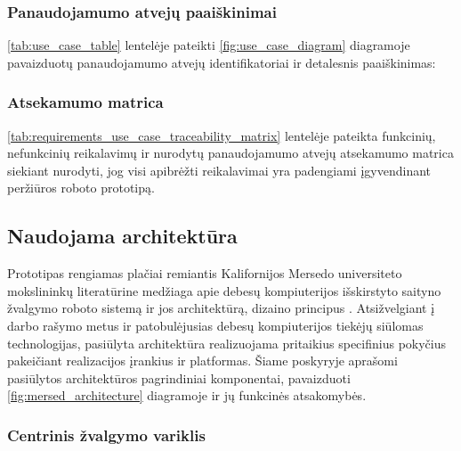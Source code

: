 \subsubsection{Panaudojamumo atvejų paaiškinimai}
\ref{tab:use_case_table} lentelėje pateikti \ref{fig:use_case_diagram} diagramoje pavaizduotų panaudojamumo atvejų identifikatoriai ir detalesnis paaiškinimas:



\subsubsection{Atsekamumo matrica}

\ref{tab:requirements_use_case_traceability_matrix} lentelėje pateikta funkcinių, nefunkcinių reikalavimų ir nurodytų panaudojamumo atvejų atsekamumo matrica siekiant nurodyti, jog visi apibrėžti reikalavimai yra padengiami įgyvendinant peržiūros roboto prototipą.



\subsection{Naudojama architektūra}

Prototipas rengiamas plačiai remiantis Kalifornijos Mersedo universiteto mokslininkų literatūrine medžiaga apie debesų kompiuterijos išskirstyto saityno žvalgymo roboto sistemą ir jos architektūrą, dizaino principus \cite{MercedCloudBasedWebCrawler}. Atsižvelgiant į darbo rašymo metus ir patobulėjusias debesų kompiuterijos tiekėjų siūlomas technologijas, pasiūlyta architektūra realizuojama pritaikius specifinius pokyčius pakeičiant realizacijos įrankius ir platformas. Šiame poskyryje aprašomi pasiūlytos architektūros pagrindiniai komponentai, pavaizduoti \ref{fig:mersed_architecture} diagramoje ir jų funkcinės atsakomybės.

\pagebreak




\subsubsection{Centrinis žvalgymo variklis}
 
